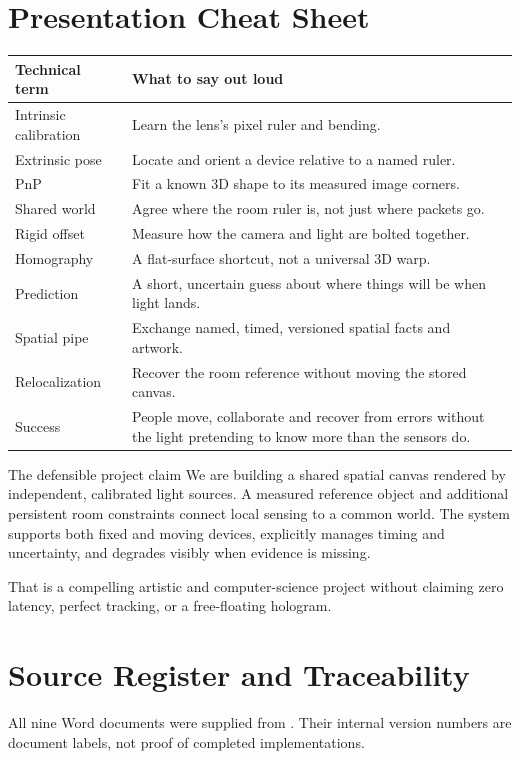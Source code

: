 \documentclass[11pt,a4paper]{article}
\begin{document}
\section{Presentation Cheat Sheet}
\begin{tabularx}{\linewidth}{@{}L{36mm}X@{}}
\toprule Technical term & What to say out loud\\ \midrule
Intrinsic calibration & Learn the lens's pixel ruler and bending.\\
Extrinsic pose & Locate and orient a device relative to a named ruler.\\
PnP & Fit a known 3D shape to its measured image corners.\\
Shared world & Agree where the room ruler is, not just where packets go.\\
Rigid offset & Measure how the camera and light are bolted together.\\
Homography & A flat-surface shortcut, not a universal 3D warp.\\
Prediction & A short, uncertain guess about where things will be when light lands.\\
Spatial pipe & Exchange named, timed, versioned spatial facts and artwork.\\
Relocalization & Recover the room reference without moving the stored canvas.\\
Success & People move, collaborate and recover from errors without the light
pretending to know more than the sensors do.\\
\bottomrule
\end{tabularx}

\begin{plain}{The defensible project claim}
We are building a shared spatial canvas rendered by independent, calibrated
light sources. A measured reference object and additional persistent room
constraints connect local sensing to a common world. The system supports
both fixed and moving devices, explicitly manages timing and uncertainty,
and degrades visibly when evidence is missing.

That is a compelling artistic and computer-science project without claiming
zero latency, perfect tracking, or a free-floating hologram.
\end{plain}

\appendix
\section{Source Register and Traceability}
\label{sec:sources}
All nine Word documents were supplied from
.
Their internal version numbers are document labels, not proof of completed
implementations.
\end{document}
